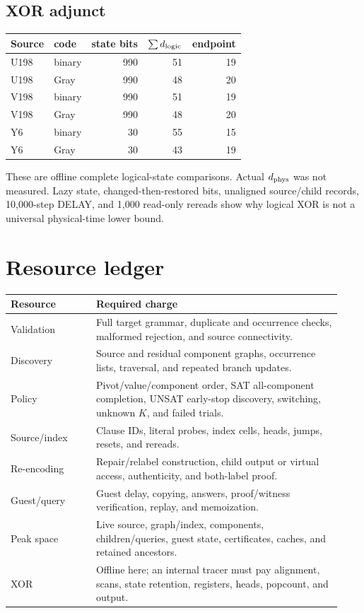 \documentclass[11pt]{article}
\begin{document}
\subsection*{XOR adjunct}
\begin{center}
\begin{tabular}{llrrr}
\toprule
Source & code & state bits & $\sum d_{\rm logic}$ & endpoint\\
\midrule
U198 & binary & 990 & 51 & 19\\
U198 & Gray   & 990 & 48 & 20\\
V198 & binary & 990 & 51 & 19\\
V198 & Gray   & 990 & 48 & 20\\
Y6   & binary & 30  & 55 & 15\\
Y6   & Gray   & 30  & 43 & 19\\
\bottomrule
\end{tabular}
\end{center}
These are offline complete logical-state comparisons.  Actual $d_{\rm phys}$ was not measured.  Lazy state, changed-then-restored bits, unaligned source/child records, 10,000-step DELAY, and 1,000 read-only rereads show why logical XOR is not a universal physical-time lower bound.

\section{Resource ledger}
\begin{longtable}{p{0.24\linewidth}p{0.69\linewidth}}
\toprule
Resource & Required charge\\
\midrule
\endhead
Validation & Full target grammar, duplicate and occurrence checks, malformed rejection, and source connectivity.\\
Discovery & Source and residual component graphs, occurrence lists, traversal, and repeated branch updates.\\
Policy & Pivot/value/component order, SAT all-component completion, UNSAT early-stop discovery, switching, unknown $K$, and failed trials.\\
Source/index & Clause IDs, literal probes, index cells, heads, jumps, resets, and rereads.\\
Re-encoding & Repair/relabel construction, child output or virtual access, authenticity, and both-label proof.\\
Guest/query & Guest delay, copying, answers, proof/witness verification, replay, and memoization.\\
Peak space & Live source, graph/index, components, children/queries, guest state, certificates, caches, and retained ancestors.\\
XOR & Offline here; an internal tracer must pay alignment, scans, state retention, registers, heads, popcount, and output.\\
\bottomrule
\end{longtable}
\end{document}
